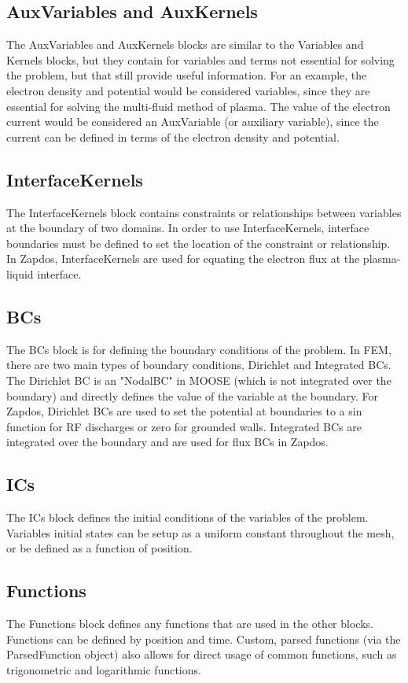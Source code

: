 \documentclass[final]{report}
\begin{document}
  \subsection{AuxVariables and AuxKernels}
  The AuxVariables and AuxKernels blocks are similar to the Variables and Kernels blocks, but they contain for variables and terms not essential for solving the problem, but that still provide useful information. For an example, the electron density and potential would be considered variables, since they are essential for solving the multi-fluid method of plasma. The value of the electron current would be considered an AuxVariable (or auxiliary variable), since the current can be defined in terms of the electron density and potential.
  \subsection{InterfaceKernels}
  The InterfaceKernels block contains constraints or relationships between variables at the boundary of two domains. In order to use InterfaceKernels, interface boundaries must be defined to set the location of the constraint or relationship. In Zapdos, InterfaceKernels are used for equating the electron flux at the plasma-liquid interface.
  \subsection{BCs}
  The BCs block is for defining the boundary conditions of the problem. In FEM, there are two main types of boundary conditions, Dirichlet and Integrated BCs. The Dirichlet BC is an "NodalBC" in MOOSE (which is not integrated over the boundary) and directly defines the value of the variable at the boundary. For Zapdos, Dirichlet BCs are used to set the potential at boundaries to a sin function for RF discharges or zero for grounded walls. Integrated BCs are integrated over the boundary and are used for flux BCs in Zapdos.
  \subsection{ICs}
  The ICs block defines the initial conditions of the variables of the problem. Variables initial states can be setup as a uniform constant throughout the mesh, or be defined as a function of position.
  \subsection{Functions}
  The Functions block defines any functions that are used in the other blocks. Functions can be defined by position and time. Custom, parsed functions (via the ParsedFunction object) also allows for direct usage of common functions, such as trigonometric and logarithmic functions.
\end{document}
